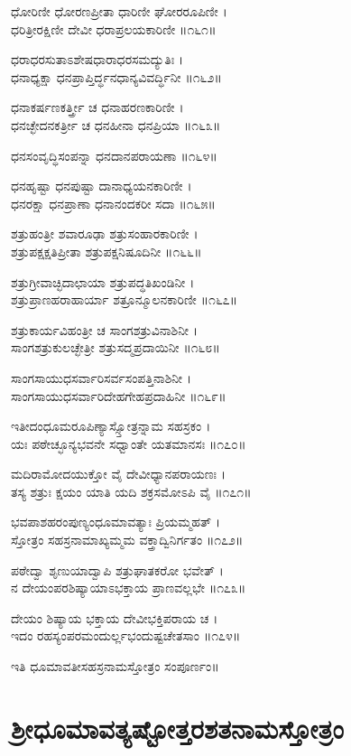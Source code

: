 ಧೋರಿಣೀ ಧೋರಣಪ್ರೀತಾ ಧಾರಿಣೀ ಘೋರರೂಪಿಣೀ ।\\
ಧರಿತ್ರೀರಕ್ಷಿಣೀ ದೇವೀ ಧರಾಪ್ರಲಯಕಾರಿಣೀ ॥೧೬೧॥

ಧರಾಧರಸುತಾಽಶೇಷಧಾರಾಧರಸಮದ್ಯುತಿಃ ।\\
ಧನಾಧ್ಯಕ್ಷಾ ಧನಪ್ರಾಪ್ತಿರ್ದ್ಧನಧಾನ್ಯವಿವರ್ದ್ಧಿನೀ ॥೧೬೨॥

ಧನಾಕರ್ಷಣಕರ್ತ್ತ್ರೀ ಚ ಧನಾಹರಣಕಾರಿಣೀ ।\\
ಧನಚ್ಛೇದನಕರ್ತ್ರೀ ಚ ಧನಹೀನಾ ಧನಪ್ರಿಯಾ ॥೧೬೩॥

ಧನಸಂವೃದ್ಧಿಸಂಪನ್ನಾ ಧನದಾನಪರಾಯಣಾ ॥೧೬೪॥

ಧನಹೃಷ್ಟಾ ಧನಪುಷ್ಟಾ ದಾನಾಧ್ಯಯನಕಾರಿಣೀ ।\\
ಧನರಕ್ಷಾ ಧನಪ್ರಾಣಾ ಧನಾನಂದಕರೀ ಸದಾ ॥೧೬೫॥

ಶತ್ರುಹಂತ್ರೀ ಶವಾರೂಢಾ ಶತ್ರುಸಂಹಾರಕಾರಿಣೀ ।\\
ಶತ್ರುಪಕ್ಷಕ್ಷತಿಪ್ರೀತಾ ಶತ್ರುಪಕ್ಷನಿಷೂದಿನೀ ॥೧೬೬॥

ಶತ್ರುಗ್ರೀವಾಚ್ಛಿದಾಛಾಯಾ ಶತ್ರುಪದ್ಧತಿಖಂಡಿನೀ ।\\
ಶತ್ರುಪ್ರಾಣಹರಾಹಾರ್ಯಾ ಶತ್ರೂನ್ಮೂಲನಕಾರಿಣೀ ॥೧೬೭॥

ಶತ್ರುಕಾರ್ಯವಿಹಂತ್ರೀ ಚ ಸಾಂಗಶತ್ರುವಿನಾಶಿನೀ ।\\
ಸಾಂಗಶತ್ರುಕುಲಚ್ಛೇತ್ರೀ ಶತ್ರುಸದ್ಮಪ್ರದಾಯಿನೀ ॥೧೬೮॥

ಸಾಂಗಸಾಯುಧಸರ್ವಾರಿಸರ್ವಸಂಪತ್ತಿನಾಶಿನೀ ।\\
ಸಾಂಗಸಾಯುಧಸರ್ವಾರಿದೇಹಗೇಹಪ್ರದಾಹಿನೀ ॥೧೬೯॥

ಇತೀದಂಧೂಮರೂಪಿಣ್ಯಾಸ್ಸ್ತೋತ್ರನ್ನಾಮ ಸಹಸ್ರಕಂ ।\\
ಯಃ ಪಠೇಚ್ಛೂನ್ಯಭವನೇ ಸಧ್ವಾಂತೇ ಯತಮಾನಸಃ ॥೧೭೦॥

ಮದಿರಾಮೋದಯುಕ್ತೋ ವೈ ದೇವೀಧ್ಯಾನಪರಾಯಣಃ ।\\
ತಸ್ಯ ಶತ್ರುಃ ಕ್ಷಯಂ ಯಾತಿ ಯದಿ ಶಕ್ರಸಮೋಽಪಿ ವೈ ॥೧೭೧॥

ಭವಪಾಶಹರಂಪುಣ್ಯಂಧೂಮಾವತ್ಯಾಃ ಪ್ರಿಯಮ್ಮಹತ್ ।\\
ಸ್ತೋತ್ರಂ ಸಹಸ್ರನಾಮಾಖ್ಯಮ್ಮಮ ವಕ್ತ್ರಾದ್ವಿನಿರ್ಗತಂ ॥೧೭೨॥

ಪಠೇದ್ವಾ ಶೃಣುಯಾದ್ವಾಪಿ ಶತ್ರುಘಾತಕರೋ ಭವೇತ್ ।\\
ನ ದೇಯಂಪರಶಿಷ್ಯಾಯಾಽಭಕ್ತಾಯ ಪ್ರಾಣವಲ್ಲಭೇ ॥೧೭೩॥

ದೇಯಂ ಶಿಷ್ಯಾಯ ಭಕ್ತಾಯ ದೇವೀಭಕ್ತಿಪರಾಯ ಚ ।\\
ಇದಂ ರಹಸ್ಯಂಪರಮಂದುರ್ಲ್ಲಭಂದುಷ್ಟಚೇತಸಾಂ ॥೧೭೪॥

ಇತಿ ಧೂಮಾವತೀಸಹಸ್ರನಾಮಸ್ತೋತ್ರಂ ಸಂಪೂರ್ಣಂ॥


\section{ಶ್ರೀಧೂಮಾವತ್ಯಷ್ಟೋತ್ತರಶತನಾಮಸ್ತೋತ್ರಂ}


